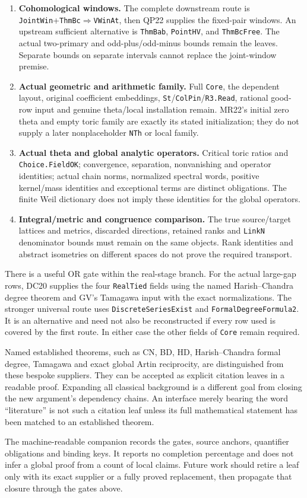 \begin{enumerate}
\item \textbf{Cohomological windows.} The complete downstream route is
\texttt{JointWin}+\texttt{ThmBc}$\Rightarrow$\texttt{VWinAt}, then QP22
supplies the fixed-pair windows.  An upstream sufficient alternative
is \texttt{ThmBab}, \texttt{PointHV}, and \texttt{ThmBcFree}.
The actual two-primary and odd-plus/odd-minus bounds remain the leaves.
Separate bounds on separate intervals cannot replace the joint-window
premise.
\item \textbf{Actual geometric and arithmetic family.} Full
\texttt{Core}, the dependent layout, original coefficient embeddings,
\texttt{St}/\texttt{ColPin}/\texttt{R3.Read}, rational good-row input
and genuine theta/local installation remain.  MR22's initial zero
theta and empty toric family are exactly its stated initialization;
they do not supply a later nonplaceholder \texttt{NTh} or local family.
\item \textbf{Actual theta and global analytic operators.} Critical
toric ratios and \texttt{Choice.FieldOK}; convergence, separation,
nonvanishing and operator identities; actual chain norms, normalized
spectral words, positive kernel/mass identities and exceptional terms
are distinct obligations.  The finite Weil dictionary does not imply
these identities for the global operators.
\item \textbf{Integral/metric and congruence comparison.} The true
source/target lattices and metrics, discarded directions, retained
ranks and \texttt{LinkN} denominator bounds must remain on the same
objects.  Rank identities and abstract isometries on different
spaces do not prove the required transport.
\end{enumerate}

There is a useful OR gate within the real-stage branch.  For the actual
large-gap rows, DC20 supplies the four \texttt{RealTied} fields using
the named Harish--Chandra degree theorem and GV's Tamagawa input with
the exact normalizations.  The stronger universal route uses
\texttt{DiscreteSeriesExist} and \texttt{FormalDegreeFormula2}.
It is an alternative and need not also be reconstructed if every row used
is covered by the first route.  In either case the other fields of
\texttt{Core} remain required.

Named established theorems, such as CN, BD, HD, Harish--Chandra formal
degree, Tamagawa and exact global Artin reciprocity, are distinguished
from these bespoke suppliers.  They can be accepted as explicit citation
leaves in a readable proof.  Expanding all classical background is a
different goal from closing the new argument's dependency chains.
An interface merely bearing the word ``literature'' is not such a
citation leaf unless its full mathematical statement has been matched
to an established theorem.

The machine-readable companion records the gates, source anchors,
quantifier obligations and binding keys.  It reports no completion
percentage and does not infer a global proof from a count of local claims.
Future work should retire a leaf only with its exact supplier or a fully
proved replacement, then propagate that closure through the gates above.
